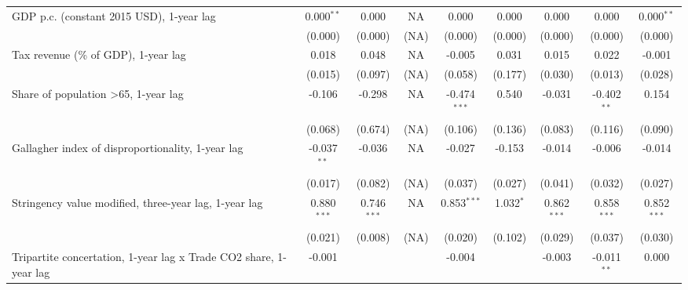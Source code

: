 \begin{table}[htbp]
\begin{tabular}{lcccccccc}
      GDP p.c. (constant 2015 USD), 1-year lag                          & 0.000$^{**}$  & 0.000                     & NA           & 0.000          & 0.000            & 0.000           & 0.000           & 0.000$^{**}$\\   
                                                                        & (0.000)       & (0.000)                   & (NA)         & (0.000)        & (0.000)          & (0.000)         & (0.000)         & (0.000)\\   
      Tax revenue (\% of GDP), 1-year lag                               & 0.018         & 0.048                     & NA           & -0.005         & 0.031            & 0.015           & 0.022           & -0.001\\   
                                                                        & (0.015)       & (0.097)                   & (NA)         & (0.058)        & (0.177)          & (0.030)         & (0.013)         & (0.028)\\   
      Share of population >65, 1-year lag                               & -0.106        & -0.298                    & NA           & -0.474$^{***}$ & 0.540            & -0.031          & -0.402$^{**}$   & 0.154\\   
                                                                        & (0.068)       & (0.674)                   & (NA)         & (0.106)        & (0.136)          & (0.083)         & (0.116)         & (0.090)\\   
      Gallagher index of disproportionality, 1-year lag                 & -0.037$^{**}$ & -0.036                    & NA           & -0.027         & -0.153           & -0.014          & -0.006          & -0.014\\   
                                                                        & (0.017)       & (0.082)                   & (NA)         & (0.037)        & (0.027)          & (0.041)         & (0.032)         & (0.027)\\   
      Stringency value modified, three-year lag, 1-year lag             & 0.880$^{***}$ & 0.746$^{***}$             & NA           & 0.853$^{***}$  & 1.032$^{*}$      & 0.862$^{***}$   & 0.858$^{***}$   & 0.852$^{***}$\\   
                                                                        & (0.021)       & (0.008)                   & (NA)         & (0.020)        & (0.102)          & (0.029)         & (0.037)         & (0.030)\\   
      Tripartite concertation, 1-year lag x Trade CO2 share, 1-year lag & -0.001        &                           &              & -0.004         &                  & -0.003          & -0.011$^{**}$   & 0.000\\   

\end{tabular}
\end{table}
